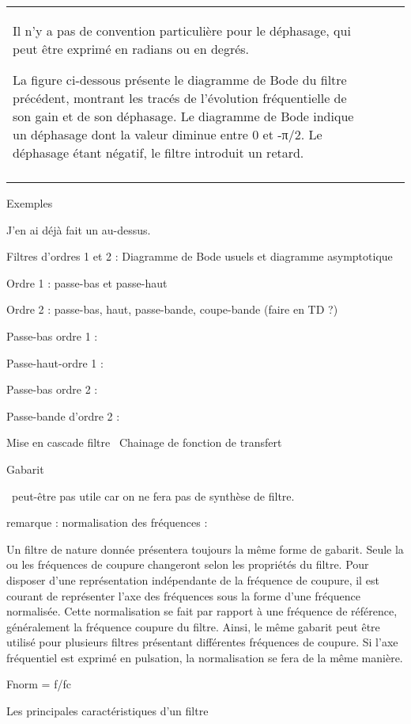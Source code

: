 \documentclass[]{article}
\begin{document}
\begin{longtable}[c]{@{}llll@{}}
\toprule\addlinespace
\begin{minipage}[t]{0.22\columnwidth}\raggedright
Il n'y a pas de convention particulière pour le déphasage, qui peut être
exprimé en radians ou en degrés.~

La figure ci-dessous présente le diagramme de Bode du filtre précédent,
montrant les tracés de l'évolution fréquentielle de son gain et de son
déphasage. Le diagramme de Bode indique un déphasage dont la valeur
diminue entre 0 et -π/2. Le déphasage étant négatif, le filtre introduit
un retard.
\end{minipage}
\\\addlinespace
\bottomrule
\end{longtable}

Exemples

J'en ai déjà fait un au-dessus.

Filtres d'ordres 1 et 2 : Diagramme de Bode usuels et diagramme
asymptotique

Ordre 1 : passe-bas et passe-haut

Ordre 2 : passe-bas, haut, passe-bande, coupe-bande (faire en TD ?)

Passe-bas ordre 1 :~

Passe-haut-ordre 1 :~

Passe-bas ordre 2 :~

Passe-bande d'ordre 2 :~

Mise en cascade filtre~ Chainage de fonction de transfert

Gabarit

~peut-être pas utile car on ne fera pas de synthèse de filtre.

remarque : normalisation des fréquences :

Un filtre de nature donnée présentera toujours la même forme de gabarit.
Seule la ou les fréquences de coupure changeront selon les propriétés du
filtre. Pour disposer d'une représentation indépendante de la fréquence
de coupure, il est courant de représenter l'axe des fréquences sous la
forme d'une fréquence normalisée. Cette normalisation se fait par
rapport à une fréquence de référence, généralement la fréquence coupure
du filtre. Ainsi, le même gabarit peut être utilisé pour plusieurs
filtres présentant différentes fréquences de coupure. Si l'axe
fréquentiel est exprimé en pulsation, la normalisation se fera de la
même manière.

Fnorm = f/fc

Les principales caractéristiques d'un filtre
\end{document}
